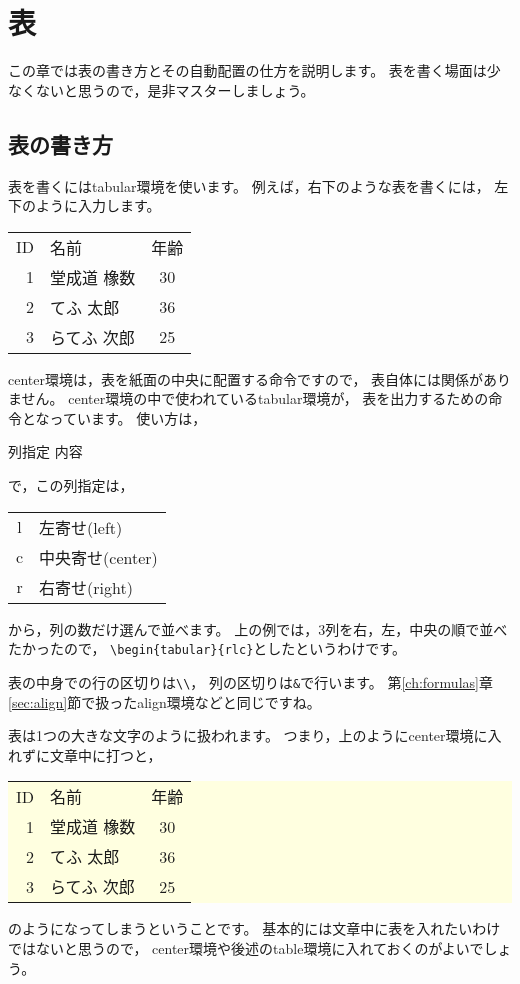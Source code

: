\chapter{表}
\label{ch:tables}

この章では表の書き方とその自動配置の仕方を説明します。
表を書く場面は少なくないと思うので，是非マスターしましょう。



\section{表の書き方}
表を書くにはtabular環境を使います。
例えば，右下のような表を書くには，
左下のように入力します。

\begin{IOTeX}
\begin{center}
\begin{tabular}{rlc}
ID & 名前 & 年齢 \\
1 & 堂成道 橡数 & 30 \\
2 & てふ 太郎 & 36 \\
3 & らてふ 次郎 & 25
\end{tabular}
\end{center}
\end{IOTeX}

center環境は，表を紙面の中央に配置する命令ですので，
表自体には関係がありません。
center環境の中で使われているtabular環境が，
表を出力するための命令となっています。
使い方は，
\begin{ITeX}
\begin{tabular}{列指定}
内容
\end{tabular}
\end{ITeX}
で，この列指定は，

\begin{tabular}{cl}
l & 左寄せ(left) \\
c & 中央寄せ(center) \\
r & 右寄せ(right)
\end{tabular}

から，列の数だけ選んで並べます。
上の例では，3列を右，左，中央の順で並べたかったので，
\verb|\begin{tabular}{rlc}|としたというわけです。

表の中身での行の区切りは\verb|\\|，
列の区切りは\verb|&|で行います。
第\ref{ch:formulas}章\ref{sec:align}節で扱ったalign環境などと同じですね。

表は1つの大きな文字のように扱われます。
つまり，上のようにcenter環境に入れずに文章中に打つと，
\colorbox{lightyellow}{%
\begin{tabular}{rlc}
ID & 名前 & 年齢 \\
1 & 堂成道 橡数 & 30 \\
2 & てふ 太郎 & 36 \\
3 & らてふ 次郎 & 25
\end{tabular}}
のようになってしまうということです。
基本的には文章中に表を入れたいわけではないと思うので，
center環境や後述のtable環境に入れておくのがよいでしょう。



